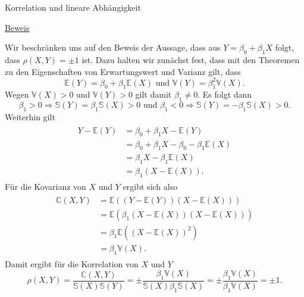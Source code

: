 \documentclass[
  8pt,
  ignorenonframetext,
]{beamer}
\begin{document}
\begin{frame}{Korrelation und lineare Abhängigkeit}
\protect\hypertarget{korrelation-und-lineare-abhuxe4ngigkeit-2}{}
\footnotesize

\underline{Beweis} 

Wir beschränken uns auf den Beweis der Aussage, dass aus
\(Y = \beta_0 + \beta_1 X\) folgt, dass \(\rho(X,Y) = \pm 1\) ist. Dazu
halten wir zunächst fest, dass mit den Theoremen zu den Eigenschaften
von Erwartungswert und Varianz gilt, dass \begin{equation}
\mathbb{E}(Y) = \beta_0 + \beta_1\mathbb{E}(X)
\mbox{ und }
\mathbb{V}(Y) = \beta_1^2 \mathbb{V}(X).
\end{equation} Wegen \(\mathbb{V}(X) > 0\) und \(\mathbb{V}(Y) > 0\)
gilt damit \(\beta_1 \neq 0\). Es folgt dann \begin{equation}
\beta_1 > 0 \Rightarrow \mathbb{S}(Y) = \beta_1 \mathbb{S}(X) > 0
\mbox{ und }
\beta_1< 0 \Rightarrow \mathbb{S}(Y) = -\beta_1 \mathbb{S}(X) > 0.
\end{equation} Weiterhin gilt \begin{align}
\begin{split}
Y - \mathbb{E}(Y)
& = \beta_0 + \beta_1X - \mathbb{E}(Y)                      \\
& = \beta_0 + \beta_1X - \beta_0 - \beta_1\mathbb{E}(X)     \\
& = \beta_1X - \beta_1\mathbb{E}(X)                         \\
& = \beta_1(X -\mathbb{E}(X)).
\end{split}
\end{align} Für die Kovarianz von \(X\) und \(Y\) ergibt sich also
\begin{align}
\begin{split}
\mathbb{C}(X,Y)
& = \mathbb{E}\left((Y - \mathbb{E}(Y))(X - \mathbb{E}(X))\right) \\
& = \mathbb{E}\left(\beta_1(X - \mathbb{E}(X))(X - \mathbb{E}(X))\right) \\
& = \beta_1\mathbb{E}\left((X - \mathbb{E}(X))^2\right) \\
& = \beta_1\mathbb{V}(X).
\end{split}
\end{align} Damit ergibt für die Korrelation von \(X\) und \(Y\)
\begin{equation}
\rho(X,Y)
= \frac{\mathbb{C}(X,Y)}{\mathbb{S}(X)\mathbb{S}(Y)}
= \pm \frac{\beta_1\mathbb{V}(X)}{\mathbb{S}(X)\beta_1 \mathbb{S}(X)}
= \pm \frac{\beta_1\mathbb{V}(X)}{\beta_1\mathbb{V}(X)}
= \pm 1.
\end{equation}
\end{frame}
\end{document}
